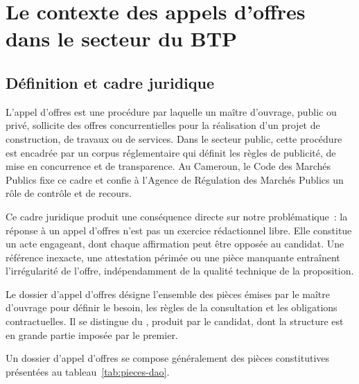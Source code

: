 \section{Le contexte des appels d'offres dans le secteur du BTP}
\label{sec:ch1-contexte}

\subsection{Définition et cadre juridique}

L'appel d'offres est une procédure par laquelle un maître d'ouvrage, public ou
privé, sollicite des offres concurrentielles pour la réalisation d'un projet de
construction, de travaux ou de services. Dans le secteur public, cette
procédure est encadrée par un corpus réglementaire qui définit les règles de
publicité, de mise en concurrence et de transparence. Au Cameroun, le Code des
Marchés Publics fixe ce cadre et confie à l'Agence de Régulation des Marchés
Publics un rôle de contrôle et de recours.

Ce cadre juridique produit une conséquence directe sur notre problématique~:
la réponse à un appel d'offres n'est pas un exercice rédactionnel libre. Elle
constitue un acte engageant, dont chaque affirmation peut être opposée au
candidat. Une référence inexacte, une attestation périmée ou une pièce manquante
entraînent l'irrégularité de l'offre, indépendamment de la qualité technique de
la proposition.

\begin{btpdef}
Le dossier d'appel d'offres désigne l'ensemble des pièces émises par le maître
d'ouvrage pour définir le besoin, les règles de la consultation et les
obligations contractuelles. Il se distingue du ,
produit par le candidat, dont la structure est en grande partie imposée par le
premier.
\end{btpdef}

Un dossier d'appel d'offres se compose généralement des pièces constitutives
présentées au tableau~\ref{tab:pieces-dao}.

